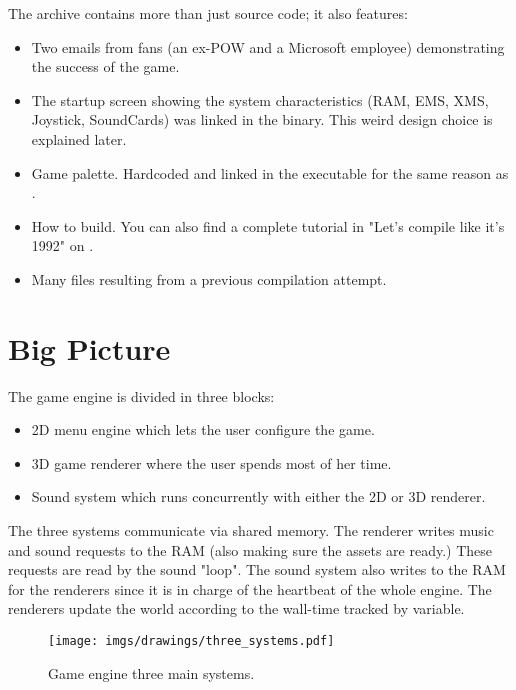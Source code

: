 \documentclass[book.tex]{subfiles}
\begin{document}
The archive contains more than just source code; it also features:
\begin{itemize}
\item {} Two emails from fans (an ex-POW and a Microsoft employee) demonstrating the success of the game.
\item {} The startup screen showing the system characteristics (RAM, EMS, XMS, Joystick, SoundCards) was linked in the binary. This weird design choice is explained later.
\item {} Game palette. Hardcoded and linked in the executable for the same reason as .
\item {} How to build. You can also find a complete tutorial in "Let's compile like it's 1992" on .
\item Many files resulting from a previous compilation attempt.
\end{itemize}







\section{Big Picture}
The game engine is divided in three blocks:
\begin{itemize}
\item 2D menu engine which lets the user configure the game.
\item 3D game renderer where the user spends most of her time.
\item Sound system which runs concurrently with either the 2D or 3D renderer. 
\end{itemize}
The three systems communicate via shared memory. The renderer writes music and sound requests to the RAM (also making sure the assets are ready.) These requests are read by the sound "loop". The sound system also writes to the RAM for the renderers since it is in charge of the heartbeat of the whole engine. The renderers update the world according to the wall-time tracked by  variable.
\par
\begin{figure}[H]
\centering
 \texttt{[image: imgs/drawings/three\_systems.pdf]}
 \caption{Game engine three main systems.}
 \end{figure}
 \par
\end{document}
